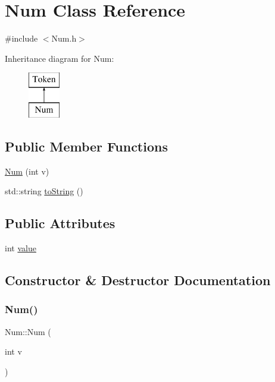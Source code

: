 \hypertarget{class_num}{}\section{Num Class Reference}
\label{class_num}


{\ttfamily \#include $<$Num.\+h$>$}

Inheritance diagram for Num\+:\begin{figure}[H]
\begin{center}
\leavevmode
\includegraphics[height=2.000000cm]{class_num}
\end{center}
\end{figure}
\subsection*{Public Member Functions}
\begin{DoxyCompactItemize}
\item 
\hyperlink{class_num_afc0c5a6bc449547b300aa036e70eda2d}{Num} (int v)
\item 
std\+::string \hyperlink{class_num_aec8ab507b42f2080a8cc197f45f0c935}{to\+String} ()
\end{DoxyCompactItemize}
\subsection*{Public Attributes}
\begin{DoxyCompactItemize}
\item 
int \hyperlink{class_num_a40cb04ca1ed295495a2e4b358b984fb8}{value}
\end{DoxyCompactItemize}


\subsection{Constructor \& Destructor Documentation}
\mbox{\label{class_num_afc0c5a6bc449547b300aa036e70eda2d}} 
\subsubsection{\texorpdfstring{Num()}{Num()}}
{\footnotesize\ttfamily Num\+::\+Num (\begin{DoxyParamCaption}\item[{int}]{v }\end{DoxyParamCaption})}



